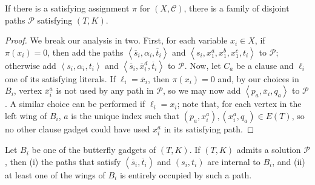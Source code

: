 \documentclass[a4paper,UKenglish,cleveref, autoref, thm-restate]{lipics-v2021}
\newcommand{\angled}[1]{\left\langle{#1}\right\rangle}
\newcommand{\ol}[1]{\overline{#1}}
\begin{document}
  \begin{lemma}
    \label{lem:forward_tournament_nph}
    If there is a satisfying assignment $\pi$ for $(X, \mathcal{C})$, there is a family
    of disjoint paths $\mathcal{P}$ satisfying $(T, K)$.
  \end{lemma}

  \begin{proof}
    We break our analysis in two. First, for each variable $x_i \in X$, if $\pi(x_i) = 0$,
    then add the paths $\angled{\ol{s}_i, \alpha_i, \ol{t}_i}$ and
    $\angled{s_i, x^a_1, x^b_1, x^c_1, t_i}$ to $\mathcal{P}$; otherwise add $\angled{s_i,
    \alpha_i, t_i}$ and $\angled{\ol{s}_i, \ol{x}^d_i, \ol{t}_i}$ to $\mathcal{P}$.
    Now, let $C_a$ be a clause and $\ell_i$ one of its satisfying literals.
    If $\ell_i = \ol{x}_i$, then $\pi(x_i) = 0$ and, by our choices in $B_i$, vertex
    $\ol{x}^a_i$ is not used by any path in $\mathcal{P}$, so we may now add
    $\angled{p_a, \ol{x}_i, q_a}$ to $\mathcal{P}$.
    A similar choice can be performed if $\ell_i = x_i$; note that, for each vertex in the left
    wing of $B_i$, $a$ is the unique index such that $(p_a, x^a_i), (x^a_i, q_a) \in E(T)$,
    so no other clause gadget could have used $x^a_i$ in its satisfying path.
  \end{proof}

  \begin{observation}
    \label{obs:busy_wing}
    Let $B_i$ be one of the butterfly gadgets of $(T, K)$. If $(T,K)$ admits a
    solution $\mathcal{P}$, then (i) the paths that satisfy $(\ol{s}_i, \ol{t}_i)$ and
    $(s_i, t_i)$ are internal to $B_i$, and (ii) at least one of the wings of $B_i$ is
    entirely occupied by such a path.
  \end{observation}
\end{document}
